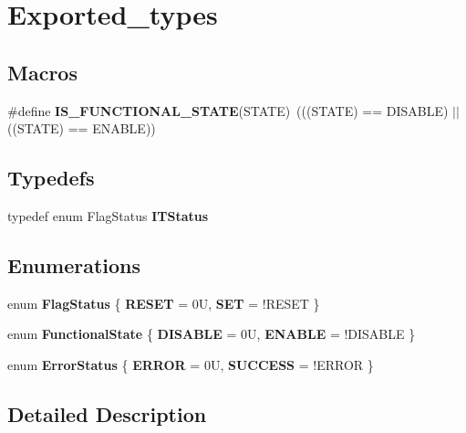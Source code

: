 \hypertarget{group___exported__types}{}\section{Exported\+\_\+types}
\label{group___exported__types}
\subsection*{Macros}
\begin{DoxyCompactItemize}
\item 
\mbox{\label{group___exported__types_gaffaf7c3f537d7a3370b1bbdda67a2bf6}} 
\#define {\bfseries I\+S\+\_\+\+F\+U\+N\+C\+T\+I\+O\+N\+A\+L\+\_\+\+S\+T\+A\+TE}(S\+T\+A\+TE)~(((S\+T\+A\+TE) == D\+I\+S\+A\+B\+LE) $\vert$$\vert$ ((S\+T\+A\+TE) == E\+N\+A\+B\+LE))
\end{DoxyCompactItemize}
\subsection*{Typedefs}
\begin{DoxyCompactItemize}
\item 
\mbox{\label{group___exported__types_gaacbd7ed539db0aacd973a0f6eca34074}} 
typedef enum Flag\+Status {\bfseries I\+T\+Status}
\end{DoxyCompactItemize}
\subsection*{Enumerations}
\begin{DoxyCompactItemize}
\item 
\mbox{\label{group___exported__types_ga89136caac2e14c55151f527ac02daaff}} 
enum {\bfseries Flag\+Status} \{ {\bfseries R\+E\+S\+ET} = 0U, 
{\bfseries S\+ET} = !\+R\+E\+S\+ET
 \}
\item 
\mbox{\label{group___exported__types_gac9a7e9a35d2513ec15c3b537aaa4fba1}} 
enum {\bfseries Functional\+State} \{ {\bfseries D\+I\+S\+A\+B\+LE} = 0U, 
{\bfseries E\+N\+A\+B\+LE} = !\+D\+I\+S\+A\+B\+LE
 \}
\item 
\mbox{\label{group___exported__types_ga8333b96c67f83cba354b3407fcbb6ee8}} 
enum {\bfseries Error\+Status} \{ {\bfseries E\+R\+R\+OR} = 0U, 
{\bfseries S\+U\+C\+C\+E\+SS} = !\+E\+R\+R\+OR
 \}
\end{DoxyCompactItemize}


\subsection{Detailed Description}
